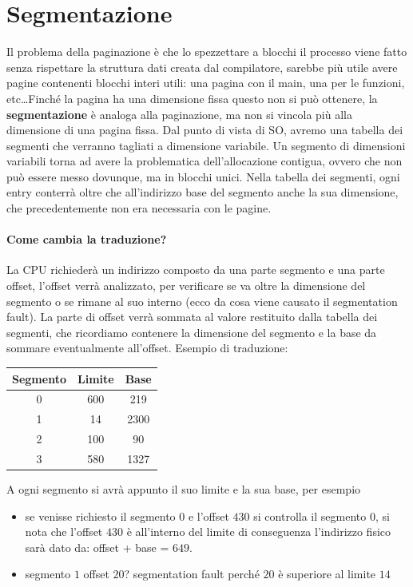 \documentclass[a4paper, 12pt]{book}
\begin{document}
\section{Segmentazione}
Il problema della paginazione è che lo spezzettare a blocchi il processo viene fatto senza rispettare la struttura dati 
creata dal compilatore, sarebbe più utile avere pagine contenenti blocchi interi utili: una pagina con il main, una per le 
funzioni, etc\dots Finché la pagina ha una dimensione fissa questo non si può ottenere, la \textbf{segmentazione} è analoga alla 
paginazione, ma non si vincola più alla dimensione di una pagina fissa. Dal punto di vista di SO, avremo una tabella dei segmenti 
che verranno tagliati a dimensione variabile. Un segmento di dimensioni variabili torna ad avere la problematica dell'allocazione 
contigua, ovvero che non può essere messo dovunque, ma in blocchi unici. Nella tabella dei segmenti, ogni entry conterrà oltre 
che all'indirizzo base del segmento anche la sua dimensione, che precedentemente non era necessaria con le pagine. 
\paragraph{Come cambia la traduzione?}
La CPU richiederà un indirizzo composto da una parte segmento e una parte offset, l'offset verrà analizzato, per verificare se 
va oltre la dimensione del segmento o se rimane al suo interno (ecco da cosa viene causato il segmentation fault). La parte di offset
verrà sommata al valore restituito dalla tabella dei segmenti, che ricordiamo contenere la dimensione del segmento e la base da sommare
eventualmente all'offset. Esempio di traduzione:
\begin{center}
    \begin{tabular}{| c | c | c |}  
        \hline
        Segmento & Limite & Base \\
        \hline
        0 & 600 & 219 \\
        \hline
        1 & 14 & 2300 \\
        \hline
        2 & 100 & 90 \\
        \hline
        3 & 580 & 1327 \\
        \hline      
    \end{tabular}
\end{center}

A ogni segmento si avrà appunto il suo limite e la sua base, per esempio

\begin{itemize}
    \item se venisse richiesto il segmento $0$ e l'offset $430$ 
    si controlla il segmento $0$, si nota che l'offset $430$ è all'interno del limite di conseguenza l'indirizzo fisico sarà dato da: 
    offset + base = $649$.
    \item segmento $1$ offset $20$? segmentation fault perché $20$ è superiore al limite $14$
\end{itemize} 
\end{document}
